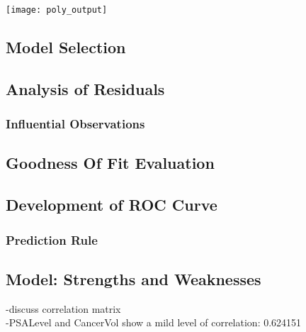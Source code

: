 \texttt{[image: poly\_output]}

\subsection{Model Selection}

\subsection{Analysis of Residuals}
\subsubsection{Influential Observations}

\subsection{Goodness Of Fit Evaluation}

\subsection{Development of ROC Curve}
\subsubsection{Prediction Rule}

\subsection{Model: Strengths and Weaknesses}
-discuss correlation matrix \\
-PSALevel and CancerVol show a mild level of correlation: 0.624151